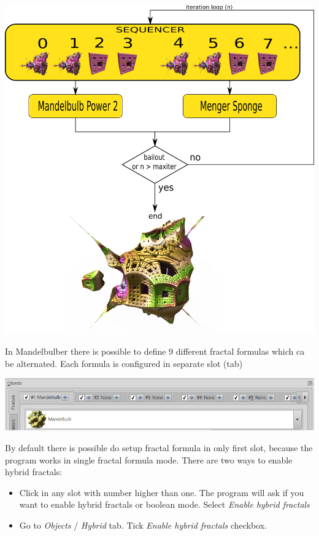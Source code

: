 \includegraphics[width=\linewidth]{img/manual/media/iteration_loop_hybrid.png}

In Mandelbulber there is possible to define 9 different fractal formulas which
ca be alternated. Each formula is configured in separate slot (tab)

\includegraphics[width=\linewidth]{img/manual/media/fractal_tabs.png}

By default there is possible do setup fractal formula in only first slot,
because the program works in single fractal formula mode. There are two ways to
enable hybrid fractals: \begin{itemize} \item Click in any slot with number
	higher than one. The program will ask if you want to enable hybrid fractals or
	boolean mode. Select \emph{Enable hybrid fractals} \item Go to \emph{Objects} /
	\emph{Hybrid} tab. Tick \emph{Enable hybrid fractals} checkbox. \end{itemize}

